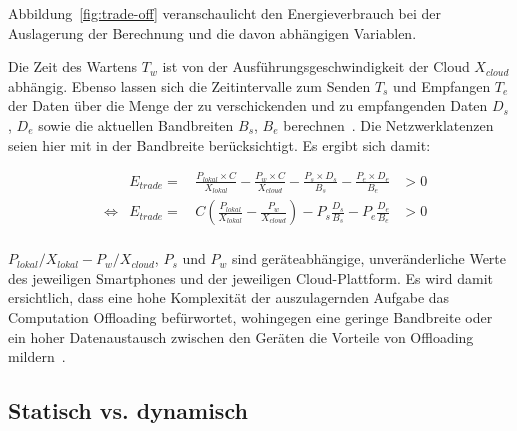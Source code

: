 \documentclass{sigchi}
\begin{document}
Abbildung~\ref{fig:trade-off} veranschaulicht den Energieverbrauch bei der Auslagerung der Berechnung und die davon abhängigen Variablen.

Die Zeit des Wartens $T_w$ ist von der Aus\-füh\-rungs\-ge\-schwin\-dig\-keit der Cloud $X_{\textit{cloud}}$ abhängig.
Ebenso lassen sich die Zeitintervalle zum Senden $T_s$ und Empfangen $T_e$ der Daten über die Menge der zu verschickenden und zu empfangenden Daten $D_s$, $D_e$ sowie die aktuellen Bandbreiten $B_s$, $B_e$ berechnen~\cite{o8}.
Die Netzwerklatenzen seien hier mit in der Bandbreite berücksichtigt.
Es ergibt sich damit:

\begin{align*}
	& & E_{\textit{trade}} = & \,\frac{P_{\textit{lokal}} \times C}{X_\textit{lokal}} - \frac{P_w \times C}{X_{\textit{cloud}}} - \frac{P_s \times D_s}{B_s} - \frac{P_e \times D_e}{B_e} & > 0 \\
	& \Leftrightarrow & E_{\textit{trade}} = & \, C\left( \frac{P_{\textit{lokal}}}{X_\textit{lokal}} - \frac{P_w}{X_{\textit{cloud}}} \right) - P_s\frac{D_s}{B_s} - P_e\frac{D_e}{B_e} & > 0 \\
\end{align*}

$P_{\textit{lokal}}/X_{\textit{lokal}} - P_{\textit{w}}/X_{\textit{cloud}}$, $P_s$ und $P_w$ sind geräteabhängige, unveränderliche Werte des jeweiligen Smartphones und der jeweiligen Cloud-Plattform.
Es wird damit ersichtlich, dass eine hohe Komplexität der auszulagernden Aufgabe das Computation Offloading befürwortet, wohingegen eine geringe Bandbreite oder ein hoher Datenaustausch zwischen den Geräten die Vorteile von Offloading mildern~\cite{o8}.

\subsection{Statisch vs. dynamisch}
\end{document}
